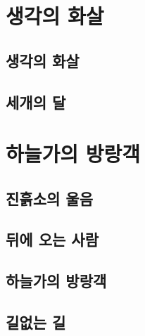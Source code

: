 \documentclass[12pt, a4paper, oneside]{book}
\let\stdsection\section
\renewcommand\section{\newpage\stdsection}
\begin{document}
	\chapter{ 생각의 화살}


%										
	\section{ 생각의 화살}

%										
	\section{ 세개의 달}

%										
	\chapter{ 하늘가의 방랑객}


%										
	\section{ 진흙소의 울음}

%										
	\section{ 뒤에 오는 사람 }

%										
	\section{ 하늘가의 방랑객}


%										
	\section{ 길없는 길}






\end{document}
